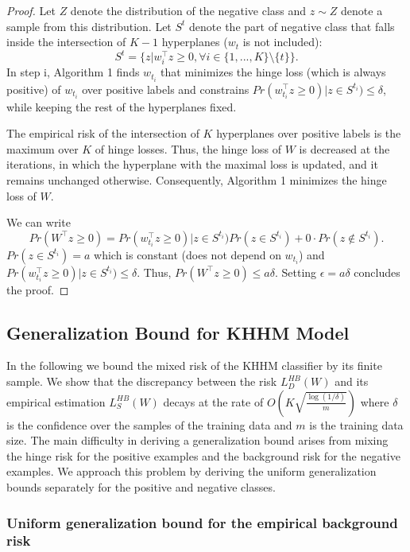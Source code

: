 \documentclass[twoside,11pt]{article}
\begin{document}
\begin{proof}
Let $Z$ denote the distribution of the negative class and $z\sim Z$ denote a sample from this distribution.  Let $S^t$ denote the  part of negative class that falls inside the intersection of $K-1$ hyperplanes ($w_t$ is not included): $$S^t= \{z|w_i^\top z\geq 0, \forall i \in \{1,...,K\}\setminus\{t\} \}.$$
In step i, Algorithm 1 finds $w_{t_i}$ that minimizes the hinge loss (which is always positive) of $w_{t_i}$ over positive labels and constrains  $Pr(w_{t_i}^\top z \geq 0)| z \in S^{t_i})\leq \delta$, while keeping the rest of the hyperplanes fixed.

The empirical risk of the intersection of $K$ hyperplanes over positive labels is the maximum over $K$ of hinge losses. Thus, the hinge loss of $W$ is decreased at the iterations, in which the hyperplane with the maximal loss is updated, and it remains unchanged otherwise. Consequently,  Algorithm 1  minimizes the hinge loss of $W$.

We can write
$$Pr(W^\top z \geq 0)=Pr(w_{t_i}^\top z \geq 0)| z \in S^{t_i})Pr(z \in S^{t_i})+ 0\cdot Pr(z\notin S^{t_i}).$$
$Pr(z \in S^{t_i})=a$ which is constant (does not depend on $w_{t_i}$) and $Pr(w_{t_i}^\top z \geq 0)| z \in S^{t_i})\leq \delta$. Thus, $Pr(W^\top z \geq 0)\leq a\delta $. Setting $\epsilon=a\delta$ concludes the proof.
\end{proof}



\subsection{Generalization Bound for KHHM Model}
\label{sec:khhm_bond}
In the following we bound the mixed risk of the KHHM classifier by its finite sample. We show that the discrepancy between the risk $L^{HB}_D(W)$ and its empirical estimation $L^{HB}_S(W)$ decays at the rate of $O(K \sqrt{\frac{\log (1/\delta)}{m}})$ where $\delta$ is the confidence over the samples of the training data and $m$ is the training data size. The main difficulty in deriving a generalization bound arises from mixing the hinge risk for the positive examples and the background risk for the negative examples. We approach this problem by deriving the uniform generalization bounds separately for the positive and negative classes.

\subsubsection{Uniform generalization bound for the empirical background risk}
\end{document}
